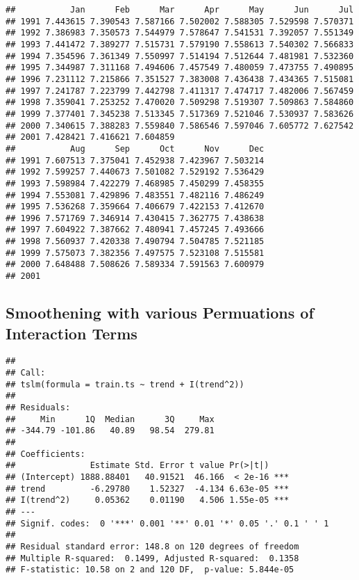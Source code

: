 \documentclass[]{article}
\begin{document}
\begin{verbatim}
##           Jan      Feb      Mar      Apr      May      Jun      Jul
## 1991 7.443615 7.390543 7.587166 7.502002 7.588305 7.529598 7.570371
## 1992 7.386983 7.350573 7.544979 7.578647 7.541531 7.392057 7.551349
## 1993 7.441472 7.389277 7.515731 7.579190 7.558613 7.540302 7.566833
## 1994 7.354596 7.361349 7.550997 7.514194 7.512644 7.481981 7.532360
## 1995 7.344987 7.311168 7.494606 7.457549 7.480059 7.473755 7.490895
## 1996 7.231112 7.215866 7.351527 7.383008 7.436438 7.434365 7.515081
## 1997 7.241787 7.223799 7.442798 7.411317 7.474717 7.482006 7.567459
## 1998 7.359041 7.253252 7.470020 7.509298 7.519307 7.509863 7.584860
## 1999 7.377401 7.345238 7.513345 7.517369 7.521046 7.530937 7.583626
## 2000 7.340615 7.388283 7.559840 7.586546 7.597046 7.605772 7.627542
## 2001 7.428421 7.416621 7.604859                                    
##           Aug      Sep      Oct      Nov      Dec
## 1991 7.607513 7.375041 7.452938 7.423967 7.503214
## 1992 7.599257 7.440673 7.501082 7.529192 7.536429
## 1993 7.598984 7.422279 7.468985 7.450299 7.458355
## 1994 7.553081 7.429896 7.483551 7.482116 7.486249
## 1995 7.536268 7.359664 7.406679 7.422153 7.412670
## 1996 7.571769 7.346914 7.430415 7.362775 7.438638
## 1997 7.604922 7.387662 7.480941 7.457245 7.493666
## 1998 7.560937 7.420338 7.490794 7.504785 7.521185
## 1999 7.575073 7.382356 7.497575 7.523108 7.515581
## 2000 7.648488 7.508626 7.589334 7.591563 7.600979
## 2001
\end{verbatim}

\subsection{Smoothening with various Permuations of Interaction
Terms}\label{smoothening-with-various-permuations-of-interaction-terms}

\begin{verbatim}
## 
## Call:
## tslm(formula = train.ts ~ trend + I(trend^2))
## 
## Residuals:
##     Min      1Q  Median      3Q     Max 
## -344.79 -101.86   40.89   98.54  279.81 
## 
## Coefficients:
##               Estimate Std. Error t value Pr(>|t|)    
## (Intercept) 1888.88401   40.91521  46.166  < 2e-16 ***
## trend         -6.29780    1.52327  -4.134 6.63e-05 ***
## I(trend^2)     0.05362    0.01190   4.506 1.55e-05 ***
## ---
## Signif. codes:  0 '***' 0.001 '**' 0.01 '*' 0.05 '.' 0.1 ' ' 1
## 
## Residual standard error: 148.8 on 120 degrees of freedom
## Multiple R-squared:  0.1499, Adjusted R-squared:  0.1358 
## F-statistic: 10.58 on 2 and 120 DF,  p-value: 5.844e-05
\end{verbatim}
\end{document}
